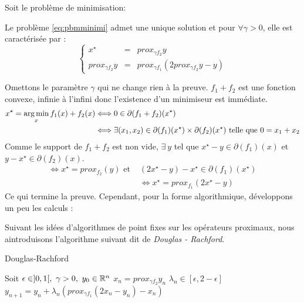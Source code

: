 \documentclass[a4paper,12pt]{article}
\begin{document}
 
Soit le problème de minimisation: \\


\begin{propriete}
Le problème \ref{eq:pbmminimi} admet une unique solution et pour $\forall \gamma >0$, elle est caractérisée par :
$$
\left\{
\begin{array}{rcl}
x^{\star} &= & prox_{\gamma f_2} y \\
prox_{\gamma f_2}y &= & prox_{\gamma f_1}(2prox_{\gamma f_2}y -y)
\end{array}
\right.
$$
\end{propriete}

\begin{preuve}
Omettons le paramètre $\gamma$ qui ne change rien à la preuve. $f_1+f_2$ est une fonction convexe, infinie à l'infini donc l'existence d'un minimiseur est immédiate.
\begin{align*}
x^{\star} =\operatorname*{arg\,min}_x f_1(x) + f_2(x) &\Longleftrightarrow 0\in \partial (f_1+f_2)(x^{\star}) \\
&\Longleftrightarrow \exists (x_1,x_2)\in \partial(f_1)(x^{\star})\times\partial(f_2)(x^{\star}) \text{ telle que } 0=x_1+x_2
\end{align*}
Comme le support de $f_1+f_2$ est non vide, $\exists\ y$ tel que $x^{\star}-y\in \partial(f_1)(x)$ et $y-x^{\star}\in\partial(f_2)(x)$.
\begin{align*}
\Longleftrightarrow x^{\star}=prox_{f_2} (y) \text{ et } &(2x^{\star}-y)-x^{\star}\in\partial(f_1)(x^{\star})\\
&\Longleftrightarrow x^{\star} = prox_{f_1}(2x^{\star}-y)
\end{align*}
Ce qui termine la preuve. Cependant, pour la forme algorithmique, développons un peu les calculs : 


\end{preuve}

Suivant les idées d'algorithmes de point fixes sur les opérateurs proximaux, nous aintroduisons l'algorithme suivant dit de \emph{Douglas - Rachford}.
\begin{algorithm}
\caption{Douglas-Rachford}
\begin{algorithmic}
\STATE Soit $\epsilon \in ]0,1[,\ \gamma >0,\ y_0\in \RR^n$
\STATE $x_n = prox_{\gamma f_2} y_n$
\STATE $\lambda_n \in [\epsilon,2-\epsilon]$
\STATE $y_{n+1} = y_n + \lambda_n(prox_{\gamma f_1} (2x_n-y_n)-x_n)$
\ENDFOR
\end{algorithmic}
\end{algorithm}
\end{document}
